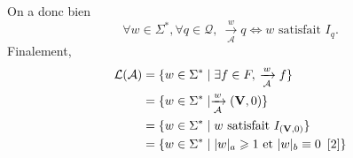 On a donc bien \[
	\forall w \in \Sigma^*,\forall q \in \mathcal{Q},\:\xrightarrow[\mathcal{A}]w q \iff w \text{ satisfait } I_q
.\] Finalement,
\begin{align*}
	\mathcal{L}(\mathcal{A}) &= \{w \in \Sigma^* \mid \exists f \in F,\:\xrightarrow[\mathcal{A}]{w} f\} \\
	&= \{w \in \Sigma^*  \mid \xrightarrow[\mathcal{A}]w ({\mathbf{V}},0)\}  \\
	&= \{w \in \Sigma^*  \mid w \text{ satisfait } I_{({\mathbf{V}},0)}\} \\
	&= \{w \in \Sigma^*  \mid |w|_a \geqslant 1 \text{ et } |w|_b \equiv 0 ~\left[ 2 \right]\} \\
\end{align*}
